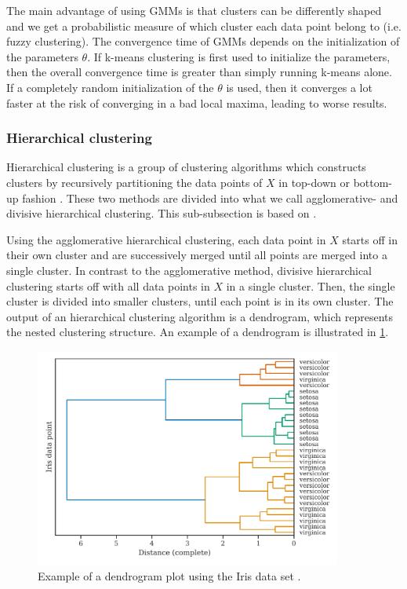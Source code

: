 The main advantage of using GMMs is that clusters can be differently shaped and we get a probabilistic measure of which cluster each data point belong to (i.e. fuzzy clustering). The convergence time of GMMs depends on the initialization of the parameters $\theta$. If k-means clustering is first used to initialize the parameters, then the overall convergence time is greater than simply running k-means alone. If a completely random initialization of the $\theta$ is used, then it converges a lot faster at the risk of converging in a bad local maxima, leading to worse results.

\subsubsection{Hierarchical clustering}
\label{sec:hierarhical-clustering}
Hierarchical clustering is a group of clustering algorithms which constructs clusters by recursively partitioning the data points of $X$ in top-down or bottom-up fashion \cite{Rokach2005}. These two methods are divided into what we call agglomerative- and divisive hierarchical clustering. This sub-subsection is based on \cite{Rokach2005}.

Using the agglomerative hierarchical clustering, each data point in $X$ starts off in their own cluster and are successively merged until all points are merged into a single cluster. In contrast to the agglomerative method, divisive hierarchical clustering starts off with all data points in $X$ in a single cluster. Then, the single cluster is divided into smaller clusters, until each point is in its own cluster. The output of an hierarchical clustering algorithm is a dendrogram, which represents the nested clustering structure. An example of a dendrogram is illustrated in \cref{fig:dendrogram-example}.
\begin{figure}[H]
    \centering
    \includegraphics[width=0.9\textwidth]{thesis/figures/dendrogram-example.pdf}
    \caption{Example of a dendrogram plot using the Iris data set \cite{Fisher1936}.}
    \label{fig:dendrogram-example}
\end{figure}


